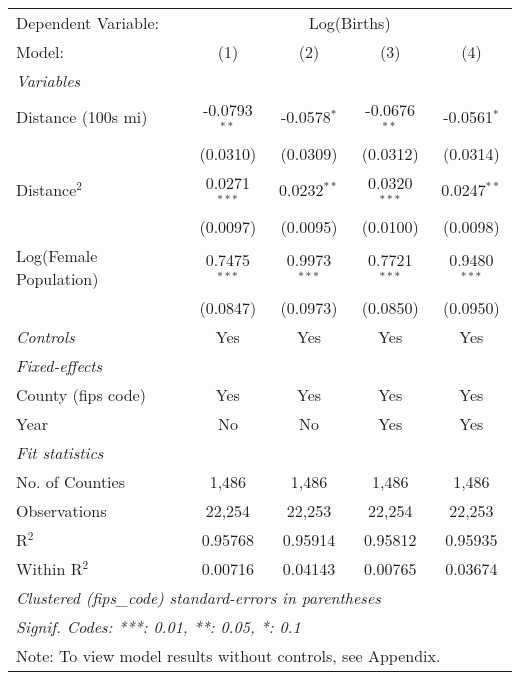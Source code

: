 \begingroup
\centering
\begin{tabular}{lcccc}
   \tabularnewline \midrule \midrule
   Dependent Variable: & \multicolumn{4}{c}{Log(Births)}\\
   Model:                     & (1)            & (2)            & (3)            & (4)\\  
   \midrule
   \emph{Variables}\\
   Distance (100s mi)         & -0.0793$^{**}$ & -0.0578$^{*}$  & -0.0676$^{**}$ & -0.0561$^{*}$\\   
                              & (0.0310)       & (0.0309)       & (0.0312)       & (0.0314)\\   
   Distance$^2$ & 0.0271$^{***}$ & 0.0232$^{**}$  & 0.0320$^{***}$ & 0.0247$^{**}$\\   
                              & (0.0097)       & (0.0095)       & (0.0100)       & (0.0098)\\   
   Log(Female Population)     & 0.7475$^{***}$ & 0.9973$^{***}$ & 0.7721$^{***}$ & 0.9480$^{***}$\\   
                              & (0.0847)       & (0.0973)       & (0.0850)       & (0.0950)\\   
   \midrule
   \emph{Controls}            & Yes             & Yes             & Yes             & Yes\\
   \midrule
   \emph{Fixed-effects}\\
   County (fips code)         & Yes            & Yes            & Yes            & Yes\\  
   Year                       & No             & No              & Yes            & Yes\\  
   \midrule
   \emph{Fit statistics}\\
   No. of Counties            & 1,486           & 1,486
   & 1,486           & 1,486\\
   Observations               & 22,254         & 22,253         & 22,254         & 22,253\\  
   R$^2$                      & 0.95768        & 0.95914        & 0.95812        & 0.95935\\  
   Within R$^2$               & 0.00716        & 0.04143        & 0.00765        & 0.03674\\  
   \midrule \midrule
   \multicolumn{5}{l}{\emph{Clustered (fips\_code) standard-errors in parentheses}}\\
   \multicolumn{5}{l}{\emph{Signif. Codes: ***: 0.01, **: 0.05, *: 0.1}}\\
    \multicolumn{5}{l}{Note: To view model results without controls, see Appendix.}\\
\end{tabular}
\par\endgroup
